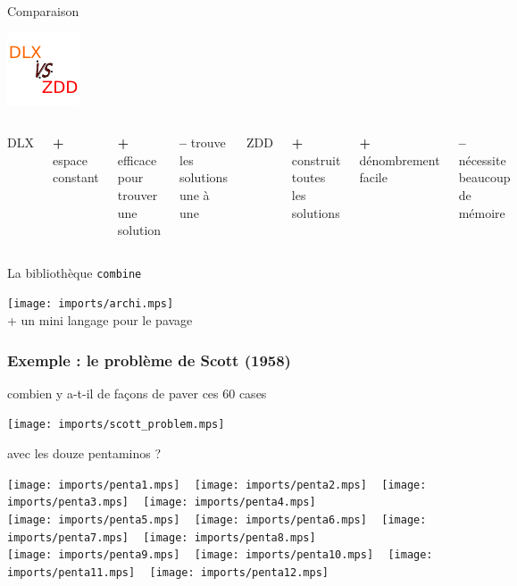 \documentclass{beamer}
\let\emph\alert
\begin{document}
\begin{frame}{Comparaison}
  \vspace*{-10em}
  \begin{center}
    \includegraphics[height=0.2\textheight]{imports/vs.pdf}
  \end{center}
  \begin{columns}
  \begin{center}
    DLX
  \end{center}
  \emph{\textbf{+}} espace constant

  \emph{\textbf{+}} efficace pour trouver \emph{une} solution

  \emph{\textbf{--}} trouve les solutions une à une

  \begin{center}
    ZDD
  \end{center}
  \emph{\textbf{+}} construit \emph{toutes} les solutions

  \emph{\textbf{+}} dénombrement facile

  \emph{\textbf{--}} nécessite beaucoup de mémoire

  \end{columns}
\end{frame}



\begin{frame}{La bibliothèque \texttt{combine}}
  \begin{center}
    \texttt{[image: imports/archi.mps]}
    \\[3em]
    + un mini langage pour le pavage
  \end{center}
\end{frame}

\begin{frame}[fragile]\frametitle{Exemple : le problème de Scott (1958)}
  combien y a-t-il de façons de paver ces 60 cases
  \begin{center}
    \texttt{[image: imports/scott\_problem.mps]}
  \end{center}
  avec les douze pentaminos ?
  \begin{center}
  \texttt{[image: imports/penta1.mps]} ~
  \texttt{[image: imports/penta2.mps]} ~
  \texttt{[image: imports/penta3.mps]} ~
  \texttt{[image: imports/penta4.mps]} \\[1em]
  \texttt{[image: imports/penta5.mps]} ~
  \texttt{[image: imports/penta6.mps]} ~
  \texttt{[image: imports/penta7.mps]} ~
  \texttt{[image: imports/penta8.mps]} \\[1em]
  \texttt{[image: imports/penta9.mps]} ~
  \texttt{[image: imports/penta10.mps]} ~
  \texttt{[image: imports/penta11.mps]} ~
  \texttt{[image: imports/penta12.mps]}
  \end{center}
\end{frame}
\end{document}
